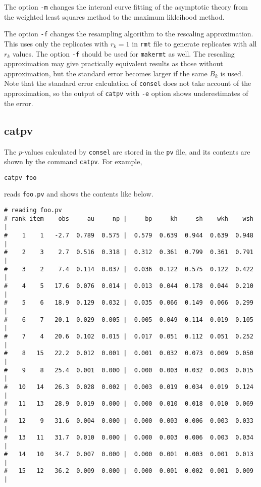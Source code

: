 \documentclass[12pt]{article}
\begin{document}
The option {\tt -m} changes the interanl curve fitting of the asymptotic
theory from the weighted least squares method to the maximum likleihood
method.

The option {\tt -f} changes the resampling algorithm to the rescaling
approximation. This uses only the replicates with $r_k=1$ in {\tt rmt}
file to generate replicates with all $r_k$ values. The option {\tt -f}
should be used for {\tt makermt} as well. The rescaling approximation
may give practically equivalent results as those without approximation,
but the standard error becomes larger if the same $B_k$ is used. Note
that the standard error calculation of {\tt consel} does not take account of
the approximation, so the output of {\tt catpv} with {\tt -e} option
shows underestimates of the error.



\subsection{catpv}

The $p$-values calculated by {\tt consel} are stored in the {\tt pv}
file, and its contents are shown by the command {\tt catpv}. For
example,
\begin{verbatim}
catpv foo
\end{verbatim}
reads {\tt foo.pv} and shows the contents like below.
{\small
\begin{verbatim}
# reading foo.pv
# rank item    obs     au     np |     bp     kh     sh    wkh    wsh |
#    1    1   -2.7  0.789  0.575 |  0.579  0.639  0.944  0.639  0.948 |
#    2    3    2.7  0.516  0.318 |  0.312  0.361  0.799  0.361  0.791 |
#    3    2    7.4  0.114  0.037 |  0.036  0.122  0.575  0.122  0.422 |
#    4    5   17.6  0.076  0.014 |  0.013  0.044  0.178  0.044  0.210 |
#    5    6   18.9  0.129  0.032 |  0.035  0.066  0.149  0.066  0.299 |
#    6    7   20.1  0.029  0.005 |  0.005  0.049  0.114  0.019  0.105 |
#    7    4   20.6  0.102  0.015 |  0.017  0.051  0.112  0.051  0.252 |
#    8   15   22.2  0.012  0.001 |  0.001  0.032  0.073  0.009  0.050 |
#    9    8   25.4  0.001  0.000 |  0.000  0.003  0.032  0.003  0.015 |
#   10   14   26.3  0.028  0.002 |  0.003  0.019  0.034  0.019  0.124 |
#   11   13   28.9  0.019  0.000 |  0.000  0.010  0.018  0.010  0.069 |
#   12    9   31.6  0.004  0.000 |  0.000  0.003  0.006  0.003  0.033 |
#   13   11   31.7  0.010  0.000 |  0.000  0.003  0.006  0.003  0.034 |
#   14   10   34.7  0.007  0.000 |  0.000  0.001  0.003  0.001  0.013 |
#   15   12   36.2  0.009  0.000 |  0.000  0.001  0.002  0.001  0.009 |
\end{verbatim}
}
\end{document}
